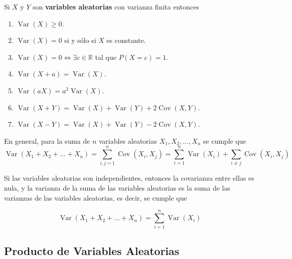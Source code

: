 Si \( X \) y \( Y \) son \textbf{variables aleatorias} con varianza finita
entonces

\begin{enumerate}
    \item \( \operatorname{Var}(X) \geq 0 \).
    \item \( \operatorname{Var}(X) = 0 \) si y sólo si \( X \) es constante.
    \item \( \operatorname{Var}(X) = 0 \iff \exists c \in \mathbb{R} \) tal que \( P(X = c) = 1 \).
    \item \(\operatorname{Var}(X+a) = \operatorname{Var}(X)\).
    \item \(\operatorname{Var}(aX) = a^2 \operatorname{Var}(X)\).
    \item \(\operatorname{Var}(X+Y) = \operatorname{Var}(X) + \operatorname{Var}(Y) + 2 \operatorname{Cov}(X,Y)\).
    \item \(\operatorname{Var}(X-Y) = \operatorname{Var}(X) + \operatorname{Var}(Y) - 2 \operatorname{Cov}(X,Y)\).
\end{enumerate}

\begin{teorema}
    En general, para la suma de $n$ variables aleatorias $X_1, X_2, \dots, X_n$ se cumple que
    \begin{equation}
        \operatorname{Var}(X_1 + X_2 + \dots + X_n) = \sum_{i,j = 1}^{n} \operatorname{Cov}(X_i, X_j) = \sum_{i = 1}^{n} \operatorname{Var}(X_i) + \sum_{i \neq j} \operatorname{Cov}(X_i, X_j)
    \end{equation}
\end{teorema}

Si las variables aleatorias son independientes, entonces la covarianza entre
ellas es nula, y la varianza de la suma de las variables aleatorias es la suma
de las varianzas de las variables aleatorias, es decir, se cumple que

\begin{equation}
    \operatorname{Var}(X_1 + X_2 + \dots + X_n) = \sum_{i = 1}^{n} \operatorname{Var}(X_i)
\end{equation}

\subsection*{Producto de Variables Aleatorias}

